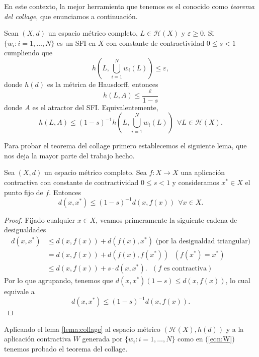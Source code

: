En este contexto, la mejor herramienta que tenemos es el conocido como \textit{teorema del collage}, que enunciamos a continuación.

\begin{teorema}
    \label{th:collage}
    Sean $(X,d)$ un espacio métrico completo, $L\in\mathcal{H}(X)$ y $\varepsilon\geq 0$. Si $\{w_i:i=1,\dots,N\}$ es un SFI en $X$ con constante de contractividad $0\leq s < 1$ cumpliendo que
    $$
    h\left(L,\bigcup_{i=1}^N w_i(L)\right) \leq \varepsilon,
    $$
    donde $h(d)$ es la métrica de Hausdorff, entonces
    $$
    h(L,A)\leq \dfrac{\varepsilon}{1-s}
    $$
    donde $A$ es el atractor del SFI. Equivalentemente,
    $$
    h(L,A)\leq(1-s)^{-1} h\left(L, \bigcup_{i=1}^N w_i(L)\right) \ \ \forall L\in\mathcal{H}(X).
    $$
\end{teorema}

Para probar el teorema del collage primero establecemos el siguiente lema, que nos deja la mayor parte del trabajo hecho.

\begin{lema}
    Sea $(X,d)$ un espacio métrico completo. Sea $f:X\longrightarrow X$ una aplicación contractiva con constante de contractividad $0\leq s < 1$ y consideramos $x^*\in X$ el punto fijo de $f$. Entonces
    $$
    d(x,x^*)\leq (1-s)^{-1} d(x,f(x)) \ \ \forall x\in X.
    $$
    \label{lema:collage}
\end{lema}
\begin{proof}
    Fijado cualquier $x\in X$, veamos primeramente la siguiente cadena de desigualdades
    \begin{equation*}
        \begin{split}
            d(x,x^*) & \leq d(x,f(x)) + d(f(x),x^*) \text{ (por la desigualdad triangular)} \\
            & = d(x,f(x)) + d(f(x),f(x^*)) \ \ \ (f(x^*)=x^*) \\
            & \leq d(x,f(x)) + s \cdot d(x,x^*). \ \ \ (f \text{ es contractiva})
        \end{split}
    \end{equation*}
    Por lo que agrupando, tenemos que $d(x,x^*)(1-s)\leq d(x,f(x))$, lo cual equivale a
    $$
    d(x,x^*)\leq (1-s)^{-1} d(x,f(x)).
    $$
\end{proof}

Aplicando el lema \ref{lema:collage} al espacio métrico $(\mathcal{H}(X), h(d))$ y a la aplicación contractiva $W$ generada por $\{w_i:i=1,\dots,N\}$ como en (\ref{eqn:W}) tenemos probado el teorema del collage.

